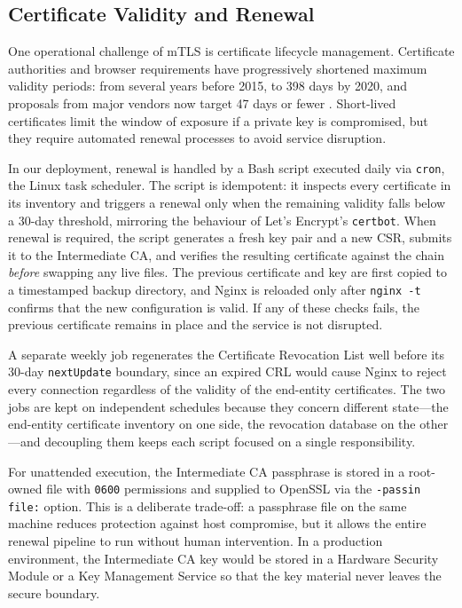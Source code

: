 \documentclass[10pt,twocolumn]{article}
\begin{document}
\subsection{Certificate Validity and Renewal}

One operational challenge of mTLS is certificate lifecycle management.
Certificate authorities and browser requirements have progressively shortened
maximum validity periods: from several years before 2015, to 398 days by
2020, and proposals from major vendors now target 47 days or fewer
\cite{rfc5280}. Short-lived certificates limit the window of exposure if a
private key is compromised, but they require automated renewal processes to
avoid service disruption.

In our deployment, renewal is handled by a Bash script executed daily via
\texttt{cron}, the Linux task scheduler. The script is idempotent: it
inspects every certificate in its inventory and triggers a renewal only
when the remaining validity falls below a 30-day threshold, mirroring the
behaviour of Let's Encrypt's \texttt{certbot}. When renewal is required,
the script generates a fresh key pair and a new CSR, submits it to the
Intermediate CA, and verifies the resulting certificate against the chain
\emph{before} swapping any live files. The previous certificate and key
are first copied to a timestamped backup directory, and Nginx is reloaded
only after \texttt{nginx -t} confirms that the new configuration is valid.
If any of these checks fails, the previous certificate remains in place
and the service is not disrupted.

A separate weekly job regenerates the Certificate Revocation List well
before its 30-day \texttt{nextUpdate} boundary, since an expired CRL would
cause Nginx to reject every connection regardless of the validity of the
end-entity certificates. The two jobs are kept on independent schedules
because they concern different state---the end-entity certificate
inventory on one side, the revocation database on the other---and
decoupling them keeps each script focused on a single responsibility.

For unattended execution, the Intermediate CA passphrase is stored in a
root-owned file with \texttt{0600} permissions and supplied to OpenSSL via
the \texttt{-passin file:} option. This is a deliberate trade-off: a
passphrase file on the same machine reduces protection against host
compromise, but it allows the entire renewal pipeline to run without human
intervention. In a production environment, the Intermediate CA key would
be stored in a Hardware Security Module or a Key Management Service so
that the key material never leaves the secure boundary.
\end{document}
